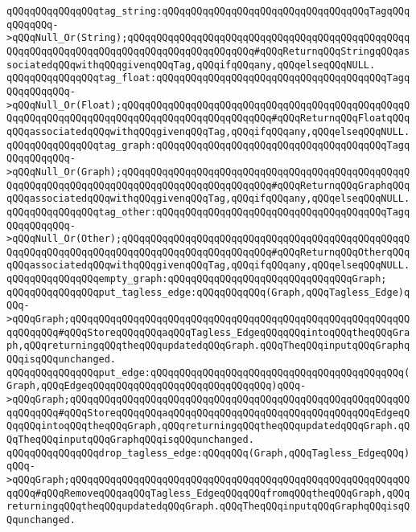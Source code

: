 \verb|qQQqqQQqqQQqqQQqtag_string:qQQqqQQqqQQqqQQqqQQqqQQqqQQqqQQqqQQqTagqQQqqQQqqQQq->qQQqNull_Or(String);qQQqqQQqqQQqqQQqqQQqqQQqqQQqqQQqqQQqqQQqqQQqqQQqqQQqqQQqqQQqqQQqqQQqqQQqqQQqqQQqqQQqqQQqqQQq#qQQqReturnqQQqStringqQQqassociatedqQQqwithqQQqgivenqQQqTag,qQQqifqQQqany,qQQqelseqQQqNULL.|\newline
\verb|qQQqqQQqqQQqqQQqtag_float:qQQqqQQqqQQqqQQqqQQqqQQqqQQqqQQqqQQqqQQqTagqQQqqQQqqQQq->qQQqNull_Or(Float);qQQqqQQqqQQqqQQqqQQqqQQqqQQqqQQqqQQqqQQqqQQqqQQqqQQqqQQqqQQqqQQqqQQqqQQqqQQqqQQqqQQqqQQqqQQqqQQq#qQQqReturnqQQqFloatqQQqqQQqassociatedqQQqwithqQQqgivenqQQqTag,qQQqifqQQqany,qQQqelseqQQqNULL.|\newline
\verb|qQQqqQQqqQQqqQQqtag_graph:qQQqqQQqqQQqqQQqqQQqqQQqqQQqqQQqqQQqqQQqTagqQQqqQQqqQQq->qQQqNull_Or(Graph);qQQqqQQqqQQqqQQqqQQqqQQqqQQqqQQqqQQqqQQqqQQqqQQqqQQqqQQqqQQqqQQqqQQqqQQqqQQqqQQqqQQqqQQqqQQqqQQq#qQQqReturnqQQqGraphqQQqqQQqassociatedqQQqwithqQQqgivenqQQqTag,qQQqifqQQqany,qQQqelseqQQqNULL.|\newline
\verb|qQQqqQQqqQQqqQQqtag_other:qQQqqQQqqQQqqQQqqQQqqQQqqQQqqQQqqQQqqQQqTagqQQqqQQqqQQq->qQQqNull_Or(Other);qQQqqQQqqQQqqQQqqQQqqQQqqQQqqQQqqQQqqQQqqQQqqQQqqQQqqQQqqQQqqQQqqQQqqQQqqQQqqQQqqQQqqQQqqQQqqQQq#qQQqReturnqQQqOtherqQQqqQQqassociatedqQQqwithqQQqgivenqQQqTag,qQQqifqQQqany,qQQqelseqQQqNULL.|\newline
\newline
\verb|qQQqqQQqqQQqqQQqempty_graph:qQQqqQQqqQQqqQQqqQQqqQQqqQQqqQQqGraph;|\newline
\newline
\verb|qQQqqQQqqQQqqQQqput_tagless_edge:qQQqqQQqqQQq(Graph,qQQqTagless_Edge)qQQq->qQQqGraph;qQQqqQQqqQQqqQQqqQQqqQQqqQQqqQQqqQQqqQQqqQQqqQQqqQQqqQQqqQQqqQQqqQQq#qQQqStoreqQQqqQQqaqQQqTagless_EdgeqQQqqQQqintoqQQqtheqQQqGraph,qQQqreturningqQQqtheqQQqupdatedqQQqGraph.qQQqTheqQQqinputqQQqGraphqQQqisqQQqunchanged.|\newline
\verb|qQQqqQQqqQQqqQQqput_edge:qQQqqQQqqQQqqQQqqQQqqQQqqQQqqQQqqQQqqQQqqQQq(Graph,qQQqEdgeqQQqqQQqqQQqqQQqqQQqqQQqqQQqqQQq)qQQq->qQQqGraph;qQQqqQQqqQQqqQQqqQQqqQQqqQQqqQQqqQQqqQQqqQQqqQQqqQQqqQQqqQQqqQQqqQQq#qQQqStoreqQQqqQQqaqQQqqQQqqQQqqQQqqQQqqQQqqQQqqQQqqQQqEdgeqQQqqQQqintoqQQqtheqQQqGraph,qQQqreturningqQQqtheqQQqupdatedqQQqGraph.qQQqTheqQQqinputqQQqGraphqQQqisqQQqunchanged.|\newline
\newline
\verb|qQQqqQQqqQQqqQQqdrop_tagless_edge:qQQqqQQq(Graph,qQQqTagless_EdgeqQQq)qQQq->qQQqGraph;qQQqqQQqqQQqqQQqqQQqqQQqqQQqqQQqqQQqqQQqqQQqqQQqqQQqqQQqqQQqqQQq#qQQqRemoveqQQqaqQQqTagless_EdgeqQQqqQQqfromqQQqtheqQQqGraph,qQQqreturningqQQqtheqQQqupdatedqQQqGraph.qQQqTheqQQqinputqQQqGraphqQQqisqQQqunchanged.|\newline
